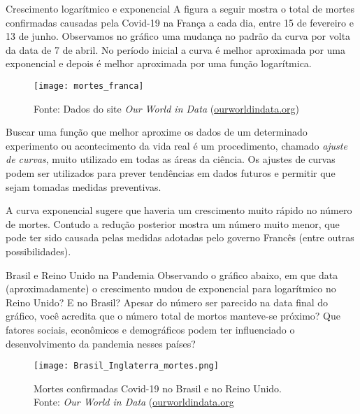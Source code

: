 \begin{example}{Crescimento logarítmico e exponencial}
A figura a seguir mostra o total de mortes confirmadas causadas pela Covid-19 na França a cada dia, entre 15 de fevereiro e 13 de junho. Observamos no gráfico uma mudança no padrão da curva por volta da data de 7 de abril. No período inicial a curva é melhor aproximada por uma exponencial e depois é melhor aproximada por uma função logarítmica.

\begin{figure}[H]
\centering

\texttt{[image: mortes\_franca]}
\caption{Fonte: Dados do site \textit{Our World in Data} (\url{ourworldindata.org})}
\end{figure}


Buscar uma função que melhor aproxime os dados de um determinado experimento ou acontecimento da vida real é um procedimento, chamado \textit{ajuste de curvas}, muito utilizado em todas as áreas da ciência. Os ajustes de curvas podem ser utilizados para prever tendências em dados futuros e permitir que sejam tomadas medidas preventivas.

A curva exponencial sugere que haveria um crescimento muito rápido no número de mortes. Contudo a redução posterior mostra um número muito menor, que pode ter sido causada pelas medidas adotadas pelo governo Francês (entre outras possibilidades).
\end{example}


\begin{task}{Brasil e Reino Unido na Pandemia}
Observando o gráfico abaixo, em que data (aproximadamente) o crescimento mudou de exponencial para logarítmico no Reino Unido? E no Brasil? Apesar do número ser parecido na data final do gráfico, você acredita que o número total de mortos manteve-se próximo? Que fatores sociais, econômicos e demográficos podem ter influenciado o desenvolvimento da pandemia nesses países? 

\begin{figure}[H]
\centering
\texttt{[image: Brasil\_Inglaterra\_mortes.png]}

\caption{Mortes confirmadas Covid-19 no Brasil e no Reino Unido. \\ Fonte: \textit{Our World in Data} (\url{ourworldindata.org}}
\end{figure}
\end{task}

